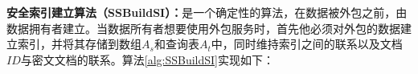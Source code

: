\textbf{安全索引建立算法（SSBuildSI）：}是一个确定性的算法，在数据被外包之前，由数据拥有者建立。当数据所有者想要使用外包服务时，首先他必须对外包的数据建立索引，并将其存储到数组$A_s$和查询表$A_t$中，同时维持索引之间的联系以及文档$ID$与密文文档的联系。算法\ref{alg:SSBuildSI}实现如下：
